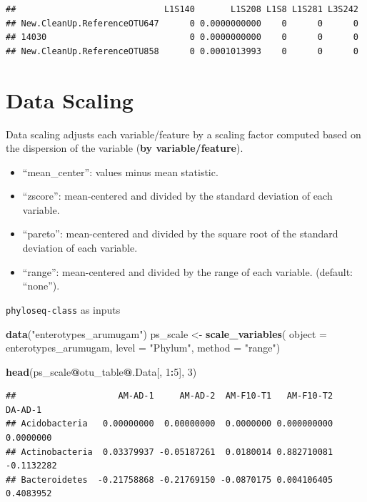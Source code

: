 \documentclass[
]{book}
\newenvironment{Shaded}{\begin{snugshade}}{\end{snugshade}}
\newcommand{\AttributeTok}[1]{\textcolor[rgb]{0.13,0.29,0.53}{#1}}
\newcommand{\DecValTok}[1]{\textcolor[rgb]{0.00,0.00,0.81}{#1}}
\newcommand{\FunctionTok}[1]{\textcolor[rgb]{0.13,0.29,0.53}{\textbf{#1}}}
\newcommand{\NormalTok}[1]{#1}
\newcommand{\OtherTok}[1]{\textcolor[rgb]{0.56,0.35,0.01}{#1}}
\newcommand{\SpecialCharTok}[1]{\textcolor[rgb]{0.81,0.36,0.00}{\textbf{#1}}}
\newcommand{\StringTok}[1]{\textcolor[rgb]{0.31,0.60,0.02}{#1}}
\begin{document}
\begin{verbatim}
##                             L1S140       L1S208 L1S8 L1S281 L3S242
## New.CleanUp.ReferenceOTU647      0 0.0000000000    0      0      0
## 14030                            0 0.0000000000    0      0      0
## New.CleanUp.ReferenceOTU858      0 0.0001013993    0      0      0
\end{verbatim}

\hypertarget{data-scaling}{%
\section{Data Scaling}\label{data-scaling}}

Data scaling adjusts each variable/feature by a scaling factor computed based on the dispersion of the variable (\textbf{by variable/feature}).

\begin{itemize}
\item
  ``mean\_center'': values minus mean statistic.
\item
  ``zscore'': mean-centered and divided by the standard deviation of each variable.
\item
  ``pareto'': mean-centered and divided by the square root of the standard deviation of each variable.
\item
  ``range'': mean-centered and divided by the range of each variable. (default: ``none'').
\end{itemize}

\texttt{phyloseq-class} as inputs

\begin{Shaded}
\begin{Highlighting}[]
\FunctionTok{data}\NormalTok{(}\StringTok{"enterotypes\_arumugam"}\NormalTok{)}
\NormalTok{ps\_scale }\OtherTok{\textless{}{-}} \FunctionTok{scale\_variables}\NormalTok{(}
  \AttributeTok{object =}\NormalTok{ enterotypes\_arumugam,}
  \AttributeTok{level =} \StringTok{"Phylum"}\NormalTok{,}
  \AttributeTok{method =} \StringTok{"range"}\NormalTok{)}

\FunctionTok{head}\NormalTok{(ps\_scale}\SpecialCharTok{@}\NormalTok{otu\_table}\SpecialCharTok{@}\NormalTok{.Data[, }\DecValTok{1}\SpecialCharTok{:}\DecValTok{5}\NormalTok{], }\DecValTok{3}\NormalTok{)}
\end{Highlighting}
\end{Shaded}

\begin{verbatim}
##                    AM-AD-1     AM-AD-2  AM-F10-T1   AM-F10-T2    DA-AD-1
## Acidobacteria   0.00000000  0.00000000  0.0000000 0.000000000  0.0000000
## Actinobacteria  0.03379937 -0.05187261  0.0180014 0.882710081 -0.1132282
## Bacteroidetes  -0.21758868 -0.21769150 -0.0870175 0.004106405  0.4083952
\end{verbatim}
\end{document}
